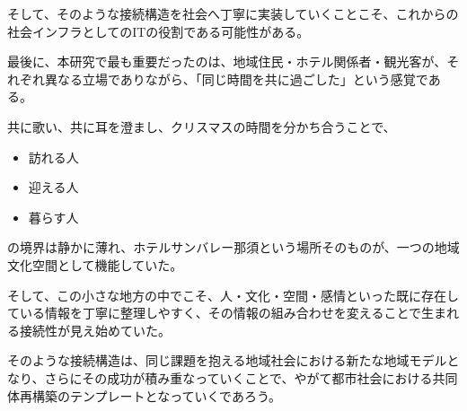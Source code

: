 そして、そのような接続構造を社会へ丁寧に実装していくことこそ、これからの社会インフラとしてのITの役割である可能性がある。

最後に、本研究で最も重要だったのは、地域住民・ホテル関係者・観光客が、それぞれ異なる立場でありながら、「同じ時間を共に過ごした」という感覚である。

共に歌い、共に耳を澄まし、クリスマスの時間を分かち合うことで、

\begin{itemize}
\item 訪れる人
\item 迎える人
\item 暮らす人
\end{itemize}

の境界は静かに薄れ、ホテルサンバレー那須という場所そのものが、一つの地域文化空間として機能していた。

そして、この小さな地方の中でこそ、人・文化・空間・感情といった既に存在している情報を丁寧に整理しやすく、その情報の組み合わせを変えることで生まれる接続性が見え始めていた。

そのような接続構造は、同じ課題を抱える地域社会における新たな地域モデルとなり、さらにその成功が積み重なっていくことで、やがて都市社会における共同体再構築のテンプレートとなっていくであろう。
